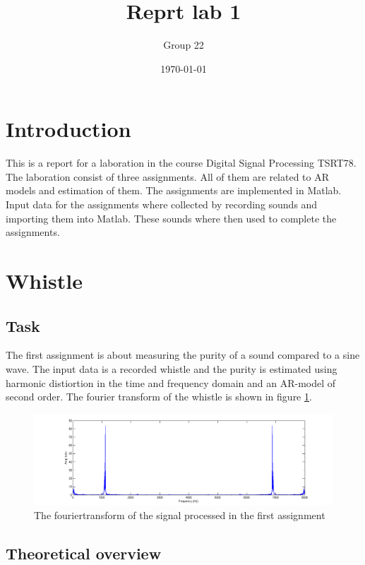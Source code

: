 \documentclass[12pt]{article}
\title{Reprt lab 1}
\author{Group 22}
\date{\today}
\begin{document}
%

\pagebreak

\maketitle

\pagebreak

\tableofcontents

\pagebreak

\section{Introduction}
This is a report for a laboration in the course Digital Signal Processing TSRT78.
The laboration consist of three assignments.
All of them are related to AR models and estimation of them.
The assignments are implemented in Matlab.
Input data for the assignments where collected by recording sounds and importing them into Matlab.
These sounds where then used to complete the assignments.

\section{Whistle}
\subsection{Task}
The first assignment is about measuring the purity of a sound compared to a sine wave. The input data is a recorded whistle and the purity is estimated using harmonic distiortion in the time and frequency domain and an AR-model of second order. The fourier transform of the whistle is shown in figure \ref{forwhis}.

\begin{figure}[H]
\centering
\includegraphics[width=14cm]{Fouriertranswhis.png}
\caption{The fouriertransform of the signal processed in the first assignment\label{forwhis}}
\end{figure}

\subsection{Theoretical overview}
\end{document}
